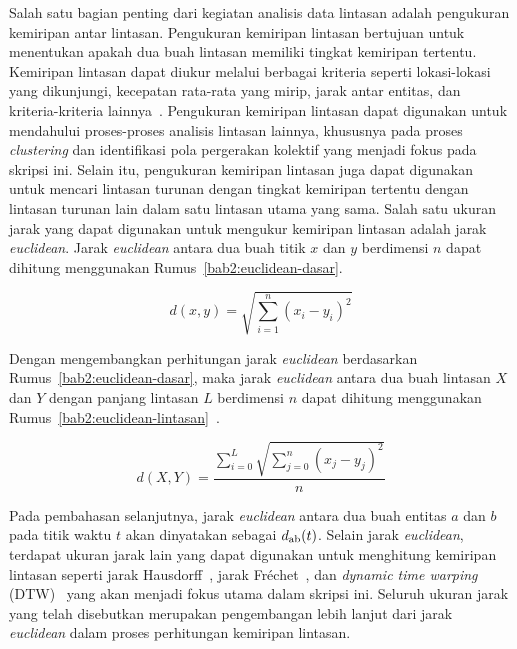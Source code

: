 Salah satu bagian penting dari kegiatan analisis data lintasan adalah pengukuran kemiripan antar lintasan. Pengukuran kemiripan lintasan bertujuan untuk menentukan apakah dua buah lintasan memiliki tingkat kemiripan tertentu. Kemiripan lintasan dapat diukur melalui berbagai kriteria seperti lokasi-lokasi yang dikunjungi, kecepatan rata-rata yang mirip, jarak antar entitas, dan kriteria-kriteria lainnya~\cite{wiratma:trajectory}. Pengukuran kemiripan lintasan dapat digunakan untuk mendahului proses-proses analisis lintasan lainnya, khususnya pada proses \textit{clustering} dan identifikasi pola pergerakan kolektif yang menjadi fokus pada skripsi ini. Selain itu, pengukuran kemiripan lintasan juga dapat digunakan untuk mencari lintasan turunan dengan tingkat kemiripan tertentu dengan lintasan turunan lain dalam satu lintasan utama yang sama. Salah satu ukuran jarak yang dapat digunakan untuk mengukur kemiripan lintasan adalah jarak \textit{euclidean}. Jarak \textit{euclidean} antara dua buah titik $x$ dan $y$ berdimensi $n$ dapat dihitung menggunakan Rumus~\ref{bab2:euclidean-dasar}.

\begin{equation}
    d(x, y) = \sqrt{\sum_{i = 1}^{n}(x_i - y_i)^2}
    \label{bab2:euclidean-dasar}
\end{equation}

Dengan mengembangkan perhitungan jarak \textit{euclidean} berdasarkan Rumus~\ref{bab2:euclidean-dasar}, maka jarak \textit{euclidean} antara dua buah lintasan $X$ dan $Y$ dengan panjang lintasan $L$ berdimensi $n$ dapat dihitung menggunakan Rumus~\ref{bab2:euclidean-lintasan}~\cite{su:02:euclidean}.

\begin{equation}
    d(X, Y) = \frac{\sum_{i=0}^{L} \sqrt{\sum_{j=0}^{n}(x_j - y_j)^2}}{n}
    \label{bab2:euclidean-lintasan}
\end{equation}

Pada pembahasan selanjutnya, jarak \textit{euclidean} antara dua buah entitas $a$ dan $b$ pada titik waktu $t$ akan dinyatakan sebagai $d\textsubscript{ab}(t)$. Selain jarak \textit{euclidean}, terdapat ukuran jarak lain yang dapat digunakan untuk menghitung kemiripan lintasan seperti jarak Hausdorff~\cite{rote:01:hausdorff}, jarak Fr\'{e}chet~\cite{alt:01:frechet}, dan \textit{dynamic time warping} (DTW)~\cite{muller:dtw} yang akan menjadi fokus utama dalam skripsi ini. Seluruh ukuran jarak yang telah disebutkan merupakan pengembangan lebih lanjut dari jarak \textit{euclidean} dalam proses perhitungan kemiripan lintasan.

